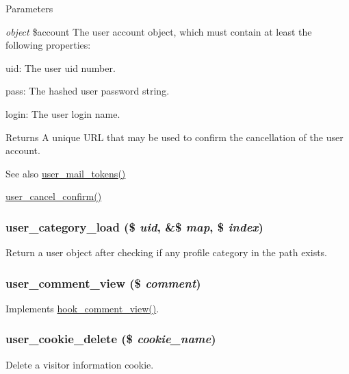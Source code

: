 \begin{DoxyParams}{Parameters}
\item[{\em object}]\$account The user account object, which must contain at least the following properties:
\begin{DoxyItemize}
\item uid: The user uid number.
\item pass: The hashed user password string.
\item login: The user login name.
\end{DoxyItemize}\end{DoxyParams}
\begin{DoxyReturn}{Returns}
A unique URL that may be used to confirm the cancellation of the user account.
\end{DoxyReturn}
\begin{DoxySeeAlso}{See also}
\hyperlink{user_8module_a0685343e7877f453320a935cb2d9c5d1}{user\_\-mail\_\-tokens()} 

\hyperlink{user_8pages_8inc_ac3ab92d15edab48212f460e0eabaafb6}{user\_\-cancel\_\-confirm()} 
\end{DoxySeeAlso}
\hypertarget{user_8module_ad5ee67e73aa6eba6ce29186eea51e6d5}{
\subsubsection[{user\_\-category\_\-load}]{\setlength{\rightskip}{0pt plus 5cm}user\_\-category\_\-load (\$ {\em uid}, \/  \&\$ {\em map}, \/  \$ {\em index})}}
\label{user_8module_ad5ee67e73aa6eba6ce29186eea51e6d5}
Return a user object after checking if any profile category in the path exists. \hypertarget{user_8module_a7f41acc702ef2d8c2161f79a709fae81}{
\subsubsection[{user\_\-comment\_\-view}]{\setlength{\rightskip}{0pt plus 5cm}user\_\-comment\_\-view (\$ {\em comment})}}
\label{user_8module_a7f41acc702ef2d8c2161f79a709fae81}
Implements \hyperlink{group__hooks_gab162cbd3dc1b0395011df47ca3f98aa3}{hook\_\-comment\_\-view()}. \hypertarget{user_8module_a9a5f709dee676b6395c7e0c2c17c2512}{
\subsubsection[{user\_\-cookie\_\-delete}]{\setlength{\rightskip}{0pt plus 5cm}user\_\-cookie\_\-delete (\$ {\em cookie\_\-name})}}
\label{user_8module_a9a5f709dee676b6395c7e0c2c17c2512}
Delete a visitor information cookie.


